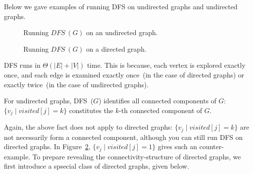 Below we gave examples of running DFS on undirected graphs and undirected graphs.

\begin{figure}[h!]
\centering{}
\caption{Running $DFS~(G)$ on an undirected graph.}
\label{fig:dfs-undirected}
\end{figure}

\begin{figure}[h!]
\centering{}
\caption{Running $DFS~(G)$ on a directed graph.}
\label{fig:dfs-directed}
\end{figure}

DFS runs in $\Theta(|E| + |V|)$ time. This is because, each vertex
is explored exactly once, and each edge is examined exactly once~(in the case of directed graphs)
or exactly twice~(in the case of undirected graphs).

\begin{fact}
For undirected graphs, DFS~($G$) identifies all connected components of $G$:
	$\{v_j \mid visited[j] = k \}$ constitutes the $k$-th connected component of $G$.
\end{fact}

Again, the above fact does not apply to directed graphs: $\{v_j \mid visited[j] = k\}$
are not necessarily form a connected component, although you can still run DFS on directed graphs. In
Figure~\ref{fig:dfs-directed}, $\{v_j \mid visited[j] = 1\}$ gives such an
counter-example.
To prepare revealing the connectivity-structure of directed graphs, we first introduce
a spsecial class of directed graphs, given below.

